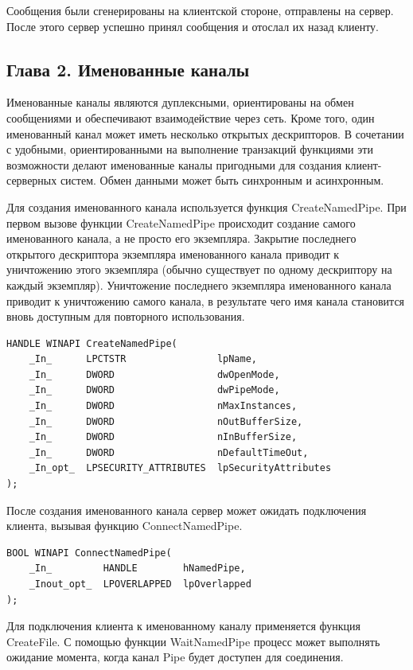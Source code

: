 \documentclass[14pt,a4paper,report]{report}
\begin{document}
Сообщения были сгенерированы на клиентской стороне, отправлены на сервер. После этого сервер успешно принял сообщения и отослал их назад клиенту.

\subsection{Глава 2. Именованные каналы}

Именованные каналы являются дуплексными, ориентированы на обмен сообщениями и обеспечивают взаимодействие через сеть. Кроме того, один именованный канал может иметь несколько открытых дескрипторов. В сочетании с удобными, ориентированными на выполнение транзакций функциями эти возможности делают именованные каналы пригодными для создания клиент-серверных систем. Обмен данными может быть синхронным и асинхронным.

Для создания именованного канала используется функция CreateNamedPipe. При первом вызове функции CreateNamedPipe происходит создание самого именованного канала, а не просто его экземпляра. Закрытие последнего открытого дескриптора экземпляра именованного канала приводит к уничтожению этого экземпляра (обычно существует по одному дескриптору на каждый экземпляр). Уничтожение последнего экземпляра именованного канала приводит к уничтожению самого канала, в результате чего имя канала становится вновь доступным для повторного использования.

\begin{verbatim}
HANDLE WINAPI CreateNamedPipe(
    _In_      LPCTSTR                lpName,
    _In_      DWORD                  dwOpenMode,
    _In_      DWORD                  dwPipeMode,
    _In_      DWORD                  nMaxInstances,
    _In_      DWORD                  nOutBufferSize,
    _In_      DWORD                  nInBufferSize,
    _In_      DWORD                  nDefaultTimeOut,
    _In_opt_  LPSECURITY_ATTRIBUTES  lpSecurityAttributes
);
\end{verbatim}

После создания именованного канала сервер может ожидать подключения клиента, вызывая функцию ConnectNamedPipe.

\begin{verbatim}
BOOL WINAPI ConnectNamedPipe(
    _In_         HANDLE        hNamedPipe,
    _Inout_opt_  LPOVERLAPPED  lpOverlapped
);
\end{verbatim}

Для подключения клиента к именованному каналу применяется функция CreateFile. С помощью функции WaitNamedPipe процесс может выполнять ожидание момента, когда канал Pipe будет доступен для соединения.
\end{document}
